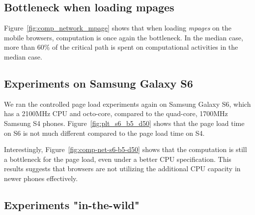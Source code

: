 \subsection{Bottleneck when loading mpages}
Figure~\ref{fig:comp_network_mpage} shows that when loading {\em mpages} on the mobile browsers, computation is once again the bottleneck. In the median case, more than 60\% of the critical path is spent on computational activities in the median case.
\begin{figure}[!htb]
\end{figure}


\subsection{Experiments on Samsung Galaxy S6}
 We ran the controlled page load experiments again on Samsung Galaxy S6, which has a 2100MHz CPU and octo-core, compared to the quad-core, 1700MHz Samsung S4 phones. Figure~\ref{fig:plt_s6_b5_d50} shows that the page load time on S6 is not much different compared to the page load time on S4. 

\noindent Interestingly, Figure~\ref{fig:comp-net-s6-b5-d50} shows that the computation is still a bottleneck for the page load, even under a better CPU specification. This results suggests that browsers are not utilizing the additional CPU capacity in newer phones effectively. 

\subsection{Experiments "in-the-wild"}
\label{sec:unrestricted}

